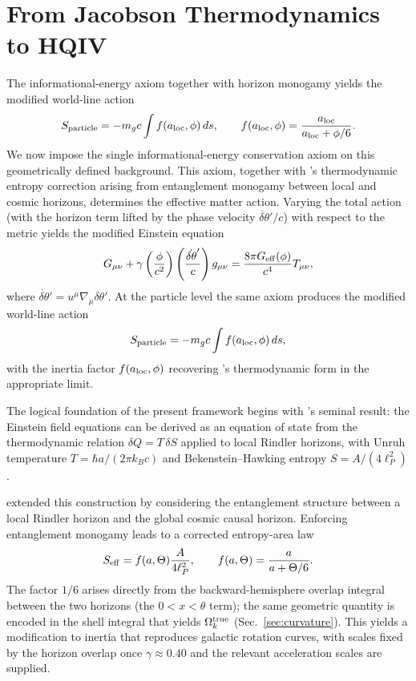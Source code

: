 \documentclass[12pt,a4paper]{article}
\begin{document}
\section{From Jacobson Thermodynamics to HQIV}
The informational-energy axiom together with horizon monogamy yields the modified world-line action
\[
S_{\rm particle} = -m_g c \int f(a_{\rm loc},\phi)\,ds, \qquad
f(a_{\rm loc},\phi) = \frac{a_{\rm loc}}{a_{\rm loc} + \phi/6}.
\]
We now impose the single informational-energy conservation axiom on this geometrically defined background. This axiom, together with \citet{brodie2026}'s thermodynamic entropy correction arising from entanglement monogamy between local and cosmic horizons, determines the effective matter action. Varying the total action (with the horizon term lifted by the phase velocity \(\dot{\delta\theta}'/c\)) with respect to the metric yields the modified Einstein equation
\[
G_{\mu\nu} + \gamma \left( \frac{\phi}{c^2} \right) \left( \frac{\dot{\delta\theta}'}{c} \right) g_{\mu\nu} = \frac{8\pi G_{\rm eff}(\phi)}{c^4} T_{\mu\nu},
\]
where \(\dot{\delta\theta}' = u^\mu \nabla_\mu \delta\theta'\). At the particle level the same axiom produces the modified world-line action
\[
S_{\rm particle} = -m_g c \int f(a_{\rm loc},\phi) \, ds,
\]
with the inertia factor \(f(a_{\rm loc},\phi)\) recovering \citet{brodie2026}'s thermodynamic form in the appropriate limit.

The logical foundation of the present framework begins with \citet{Jacobson1995}'s seminal result: the Einstein field equations can be derived as an equation of state from the thermodynamic relation $\delta Q = T\,\delta S$ applied to local Rindler horizons, with Unruh temperature $T = \hbar a/(2\pi k_B c)$ and Bekenstein--Hawking entropy $S = A/(4\ell_P^2)$ \citep{Jacobson1995}.

 \citet{brodie2026} extended this construction by considering the entanglement structure between a local Rindler horizon and the global cosmic causal horizon. Enforcing entanglement monogamy leads to a corrected entropy-area law
\[
S_{\rm eff} = f(a,\Theta)\frac{A}{4\ell_P^2}, \qquad f(a,\Theta) = \frac{a}{a + \Theta/6}.
\]
The factor $1/6$ arises directly from the backward-hemisphere overlap integral between the two horizons (the $0 < x < \theta$ term); the same geometric quantity is encoded in the shell integral that yields \(\Omega_k^{\rm true}\) (Sec.~\ref{sec:curvature}). This yields a modification to inertia that reproduces galactic rotation curves, with scales fixed by the horizon overlap once $\gamma \approx 0.40$ and the relevant acceleration scales are supplied.
\end{document}
